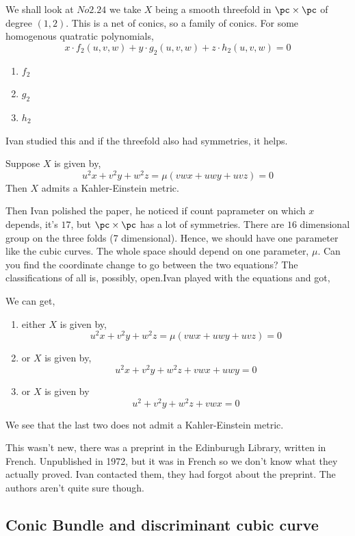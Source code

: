 \documentclass{article}
\begin{document}
We shall look at $No2.24$ we take $X$ being a smooth threefold in $\pc \times \pc$ of degree $(1, 2)$. This is a net of conics, so a family of conics. For some homogenous quatratic polynomials,
$$ x \cdot f_2 (u,v,w) + y \cdot g_2 (u, v, w) + z \cdot h_2 (u, v, w) = 0 $$
\begin{enumerate}
  \item $f_2$
  \item $g_2$
  \item $h_2$
\end{enumerate}
Ivan studied this and if the threefold also had symmetries, it helps.

\begin{nthm}[]
  Suppose $X$ is given by,
  $$ u^2x+v^2y + w^2z = \mu (vwx + uwy + uvz) = 0 $$
  Then $X$ admits a Kahler-Einstein metric.
\end{nthm}

Then Ivan polished the paper, he noticed if count paprameter on which $x$ depends, it's $17$, but $\pc \times \pc$ has a lot of symmetries. There are $16$ dimensional group on the three folds (7 dimensional). Hence, we should have one parameter like the cubic curves. The whole space should depend on one parameter, $\mu$. Can you find the coordinate change to go between the two equations? The classifications of all is, possibly, open.Ivan played with the equations and got,
\begin{nthm}
  We can get,
  \begin{enumerate}
    \item either $X$ is given by,
    $$ u^2x+v^2y + w^2z = \mu (vwx + uwy + uvz) = 0 $$
    \item or $X$ is given by,
    $$ u^2x + v^2y + w^2z + vwx + uwy = 0 $$
    \item or $X$ is given by
    $$ u^2 + v^2y + w^2z + vwx = 0 $$
  \end{enumerate}
\end{nthm}

\begin{remark}
   We see that the last two does not admit a Kahler-Einstein metric.
\end{remark}

This wasn't new, there was a preprint in the Edinburugh Library, written in French. Unpublished in 1972, but it was in French so we don't know what they actually proved. Ivan contacted them, they had forgot about the preprint. The authors aren't quite sure though.

\subsection{Conic Bundle and discriminant cubic curve}
\end{document}
